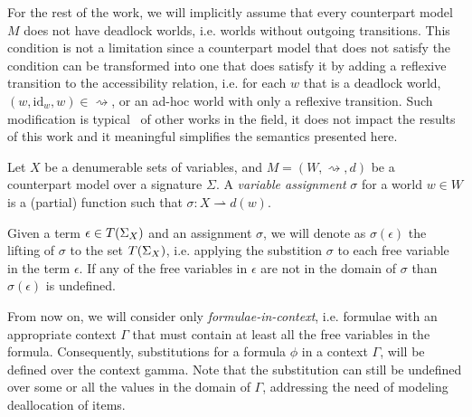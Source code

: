 For the rest of the work, we will implicitly assume that every counterpart model $M$ does not have deadlock worlds, i.e.
worlds without outgoing transitions. This condition is not a limitation since a counterpart model that does not satisfy
the condition can be transformed into one that does satisfy it by adding a reflexive transition to the accessibility
relation, i.e. for each $w$ that is a deadlock world, $(w, \text{id}_w, w) \in \rightsquigarrow$, or an ad-hoc world
with only a reflexive transition. Such modification is typical~\cite{baier_principles_2008} of other works in the field,
it does not impact the results of this work and it meaningful simplifies the semantics presented here.

\begin{definition}
  Let $X$ be a denumerable sets of variables, and $M = (W, \rightsquigarrow, d)$ be a counterpart model over a signature
  $\Sigma$. A \emph{variable assignment} $\sigma$ for a world $w \in W$ is a (partial) function such that $\sigma : X
  \rightharpoonup d(w)$.
\end{definition}

Given a term $\epsilon \in T({\Sigma}_{X})$ and an assignment $\sigma$, we will denote as
$\sigma(\epsilon)$ the lifting of $\sigma$ to the set $T({\Sigma}_{X})$, i.e. applying the substition $\sigma$ to each
free variable in the term $\epsilon$. If any of the free variables in $\epsilon$ are not in the domain of $\sigma$ than $\sigma(\epsilon)$ is undefined.

From now on, we will consider only \emph{formulae-in-context}, i.e. formulae with an appropriate context $\Gamma$ that
must contain at least all the free variables in the formula. Consequently, substitutions for a formula $\phi$ in a
context $\Gamma$, will be defined over the context gamma. Note that the substitution can still be undefined over some
or all the values in the domain of $\Gamma$, addressing the need of modeling deallocation of items.
